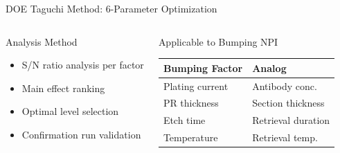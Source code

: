 \documentclass[aspectratio=169,10pt]{beamer}
\begin{document}
\begin{frame}{DOE Taguchi Method: 6-Parameter Optimization}
\begin{columns}[T]
      \begin{block}{Analysis Method}
        \small
        \begin{itemize}
          \item S/N ratio analysis per factor
          \item Main effect ranking
          \item Optimal level selection
          \item Confirmation run validation
        \end{itemize}
      \end{block}
      \vspace{0.1cm}
      \begin{alertblock}{Applicable to Bumping NPI}
        \footnotesize
        \begin{tabular}{p{2.2cm}p{2.5cm}}
          \toprule
          Bumping Factor & Analog \\
          \midrule
          Plating current & Antibody conc. \\
          PR thickness    & Section thickness \\
          Etch time       & Retrieval duration \\
          Temperature     & Retrieval temp. \\
          \bottomrule
        \end{tabular}
      \end{alertblock}
  \end{columns}
\end{frame}

\end{document}
